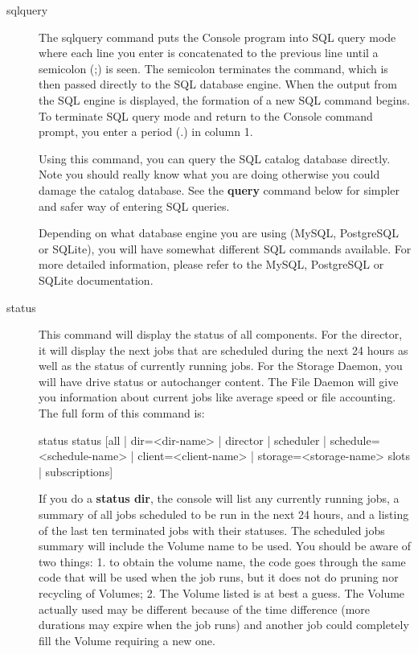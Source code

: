 \begin{description}
\item [sqlquery]
   The sqlquery command puts the Console program into SQL query mode where
   each line you enter is concatenated to the previous line until a
   semicolon (;) is seen.  The semicolon terminates the command, which is
   then passed directly to the SQL database engine.  When the output from
   the SQL engine is displayed, the formation of a new SQL command begins.
   To terminate SQL query mode and return to the Console command prompt,
   you enter a period (.) in column 1.

   Using this command, you can query the SQL catalog database directly.
   Note you should really know what you are doing otherwise you could
   damage the catalog database.  See the {\bf query} command below for
   simpler and safer way of entering SQL queries.

   Depending on what database engine you are using (MySQL, PostgreSQL or
   SQLite), you will have somewhat different SQL commands available.  For
   more detailed information, please refer to the MySQL, PostgreSQL or
   SQLite documentation.

\item [status]

   This command will display the status of all components. For the director, it
   will display the next jobs that are scheduled during the next 24 hours as
   well as the status of currently running jobs. For the Storage Daemon, you
   will have drive status or autochanger content. The File Daemon will give you
   information about current jobs like average speed or file accounting. The
   full form of this command is:

\begin{bconsole}{status}
status [all | dir=<dir-name> | director | scheduler | schedule=<schedule-name> |
        client=<client-name> | storage=<storage-name> slots | subscriptions]
\end{bconsole}

   If you do a {\bf status dir}, the console will list any currently
   running jobs, a summary of all jobs scheduled to be run in the next 24
   hours, and a listing of the last ten terminated jobs with their statuses.
   The scheduled jobs summary will include the Volume name to be used.  You
   should be aware of two things: 1. to obtain the volume name, the code
   goes through the same code that will be used when the job runs, but it
   does not do pruning nor recycling of Volumes; 2.  The Volume listed is
   at best a guess.  The Volume actually used may be different because of
   the time difference (more durations may expire when the job runs) and
   another job could completely fill the Volume requiring a new one.


\end{description}
